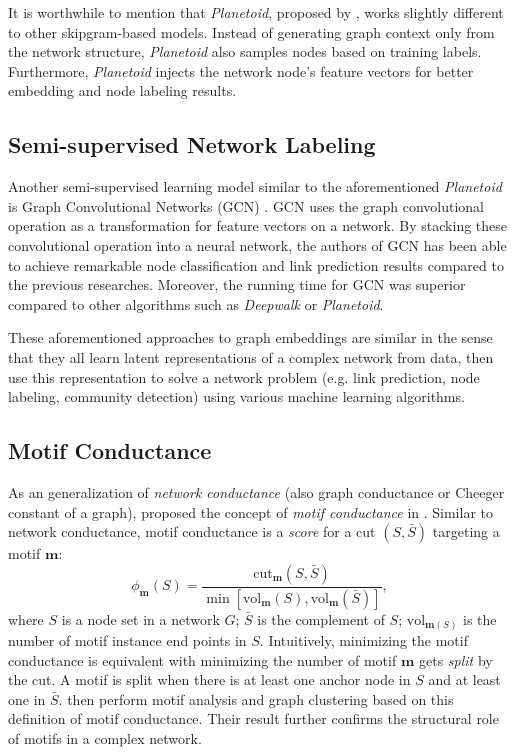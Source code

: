 \documentclass{article}
\theoremstyle{definition}
\begin{document}
It is worthwhile to mention that \emph{Planetoid}, proposed by 
\citeauthor{planetoid}, works slightly different to other skipgram-based 
models. Instead of generating graph context only from the network 
structure, \emph{Planetoid} also samples nodes based on training labels. 
Furthermore, \emph{Planetoid} injects the network
node's feature vectors for better embedding and node labeling results.


\subsection{Semi-supervised Network Labeling}

Another semi-supervised learning model similar to the aforementioned
\emph{Planetoid} is Graph Convolutional Networks (GCN) \cite{GCN}. 
GCN uses the graph convolutional operation as a transformation for 
feature vectors on a network. By stacking these convolutional operation 
into a neural network, the authors of GCN has been able to achieve 
remarkable node classification and link prediction results compared to the 
previous researches. Moreover, the running time for GCN was superior 
compared to other algorithms such as \emph{Deepwalk} or \emph{Planetoid}.


These aforementioned approaches to graph embeddings
are similar in the sense that they all learn latent representations
of a complex network from data, then use this representation to solve 
a network problem (e.g. link prediction, node labeling, community
detection) using various machine learning algorithms.

\subsection{Motif Conductance}

As an generalization of \emph{network conductance} (also graph conductance 
or Cheeger constant of a graph), \citeauthor{juremotif} proposed
the concept of \emph{motif conductance} in \cite{juremotif}. Similar to
network conductance, motif conductance is a \emph{score} for a cut 
$(S, \bar{S})$ targeting a motif $\mathbf{m}$:
\begin{equation*}
	\phi_{\mathbf{m}}(S) = \frac{\mbox{cut}_{\mathbf{m}}(S,\bar{S})}{\min[\mbox{vol}_{\mathbf{m}}(S), \mbox{vol}_{\mathbf{m}}(\bar{S})]},
\end{equation*}
where $S$ is a node set in a network $G$; $\bar{S}$ is the complement
of $S$; $\mbox{vol}_{\mathbf{m}(S)}$ is the number of motif instance
end points in $S$. Intuitively, minimizing the motif conductance is
equivalent with minimizing the number of motif $\mathbf{m}$ gets 
\emph{split} by the cut. A motif is split when there is at least one
anchor node in $S$ and at least one in $\bar{S}$. \citeauthor{juremotif}
then perform motif analysis and graph clustering based on this
definition of motif conductance. Their result further confirms the
structural role of motifs in a complex network. 
\end{document}
